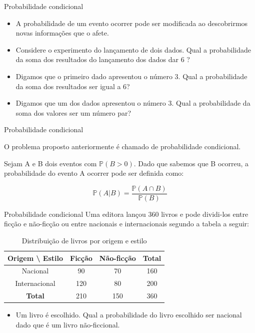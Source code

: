 \begin{frame}{Probabilidade condicional}
    \begin{itemize}
        \item  A probabilidade de um evento ocorrer pode ser modificada ao descobrirmos novas informações que o afete.
        \pause 
        \item Considere o experimento do lançamento de dois dados. Qual a probabilidade da soma dos resultados do lançamento dos dados dar 6 ?
        \pause
        \item Digamos que o primeiro dado apresentou o número 3. Qual a probabilidade da soma dos resultados ser igual a 6?
        \pause
        \item Digamos que um dos dados apresentou o número 3. Qual a probabilidade da soma dos valores ser um número par?
    \end{itemize}
   

\end{frame}

\begin{frame}{Probabilidade condicional}

O problema proposto anteriormente é chamado de probabilidade condicional.

\begin{definicao}
    Sejam A e B dois eventos com $\mathds{P}(B>0)$. Dado que sabemos que B ocorreu, a probabilidade do evento A ocorrer pode ser definida como:

    $$\mathds{P}(A|B) = \dfrac{\mathds{P}(A \cap B)}{\mathds{P}(B)}$$
\end{definicao}
\end{frame}

\begin{frame}{Probabilidade condicional}
    Uma editora lançou 360 livros e pode dividi-los entre ficção e não-ficção ou entre nacionais e internacionais segundo a tabela a seguir:
    
    \begin{table}[H]
        \centering
        \begin{tabular}{|c|c|c|c|}
        \hline
        \textbf{Origem \textbackslash{} Estilo} & \textbf{Ficção} & \textbf{Não-ficção} & \textbf{Total} \\
        \hline
        Nacional     & 90  & 70  & 160 \\
        \hline
        Internacional & 120 & 80  & 200 \\
        \hline
        \textbf{Total}       & 210 & 150 & 360 \\
        \hline
        \end{tabular}
        \caption{Distribuição de livros por origem e estilo}
        \end{table}
        
        \pause

        \begin{itemize}
            \item Um livro é escolhido. Qual a probabilidade do livro escolhido ser nacional dado que é um livro não-ficcional. 
        \end{itemize}
\end{frame}

